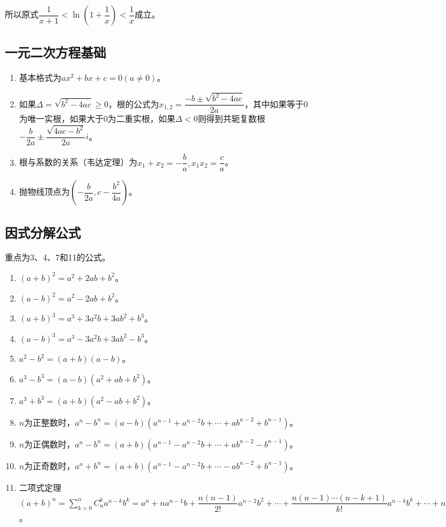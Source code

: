 \documentclass[UTF8, 12pt]{ctexart}
\begin{document}
所以原式$\dfrac{1}{x+1}<\ln(1+\dfrac{1}{x})<\dfrac{1}{x}$成立。

\subsection{一元二次方程基础}

\begin{enumerate}
    \item 基本格式为$ax^2+bx+c=0(a\neq 0)$。
    \item 如果$\Delta=\sqrt{b^2-4ac}\geqslant 0$，根的公式为$x_{1,2}=\dfrac{-b\pm\sqrt{b^2-4ac}}{2a}$，其中如果等于0为唯一实根，如果大于0为二重实根，如果$\Delta<0$则得到共轭复数根$-\dfrac{b}{2a}\pm\dfrac{\sqrt{4ac-b^2}}{2a}i$。
    \item 根与系数的关系（韦达定理）为$x_1+x_2=-\dfrac{b}{a},x_1x_2=\dfrac{c}{a}$。
    \item 抛物线顶点为$(-\dfrac{b}{2a},c-\dfrac{b^2}{4a})$。
\end{enumerate}

\subsection{因式分解公式}

重点为3、4、7和11的公式。

\begin{enumerate}
    \item $(a+b)^2=a^2+2ab+b^2$。
    \item $(a-b)^2=a^2-2ab+b^2$。
    \item $(a+b)^3=a^3+3a^2b+3ab^2+b^3$。
    \item $(a-b)^3=a^3-3a^2b+3ab^2-b^3$。
    \item $a^2-b^2=(a+b)(a-b)$。
    \item $a^3-b^3=(a-b)(a^2+ab+b^2)$。
    \item $a^3+b^3=(a+b)(a^2-ab+b^2)$。
    \item $n$为正整数时，$a^n-b^n=(a-b)(a^{n-1}+a^{n-2}b+\cdots+ab^{n-2}+b^{n-1})$。
    \item $n$为正偶数时，$a^n-b^n=(a+b)(a^{n-1}-a^{n-2}b+\cdots+ab^{n-2}-b^{n-1})$。
    \item $n$为正奇数时，$a^n+b^n=(a+b)(a^{n-1}-a^{n-2}b+\cdots-ab^{n-2}+b^{n-1})$。
    \item 二项式定理$(a+b)^n=\sum_{k=0}^nC_n^ka^{n-k}b^k=a^n+na^{n-1}b+\dfrac{n(n-1)}{2!}a^{n-2}b^2+\cdots+\dfrac{n(n-1)\cdots(n-k+1)}{k!}a^{n-k}b^k+\cdots+nab^{n-1}+b^n$。
\end{enumerate}
\end{document}
